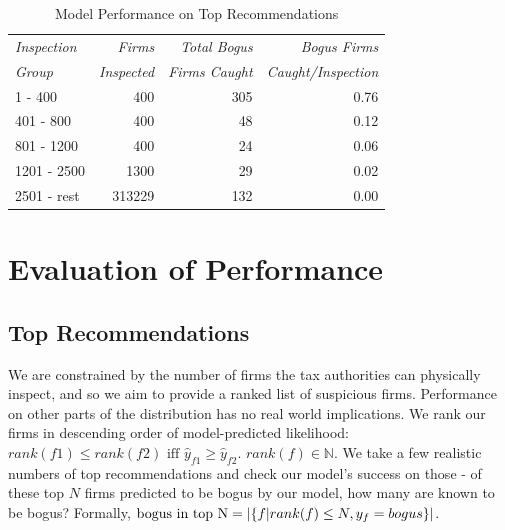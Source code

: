 \begin{table}[t!]
  \begin{tabular}{lrrr}
  	\toprule
	  {\small\textit{Inspection}}  & {\small\textit{Firms}}  &  {\small\textit{Total Bogus}}  &  {\small\textit{Bogus Firms}} \\
    {\small\textit{Group}} & {\small\textit{Inspected}} &{\small\textit{Firms Caught}} & {\small\textit{Caught/Inspection}}\\
    \midrule
              1 - 400 &              400 &                     305 &                           0.76 \\
            401 - 800 &              400 &                      48 &                           0.12 \\
            801 - 1200 &              400 &                      24 &                           0.06 \\
          1201 - 2500 &             1300 &                      29 &                           0.02 \\
          2501 - rest &           313229 &                     132 &                           0.00 \\
    \bottomrule
  \end{tabular}
  \caption{Model Performance on Top Recommendations}
  \label{tab:AllTimeCVPerformance}
\end{table}

\section{Evaluation of Performance}
\label{sec:evaluation}
\subsection{Top Recommendations}
\label{subsec:top-recommendations}
We are constrained by the number of firms the tax authorities can physically inspect, and so we aim to provide a ranked list of suspicious firms. Performance on other parts of the distribution has no real world implications. We rank our firms in descending order of model-predicted likelihood: $rank(f1) \leq rank(f2) \text{ iff } \hat{y}_{f1}\geq \hat{y}_{f2}\text{.  } rank(f) \in \mathbb{N}$. We take a few realistic numbers of top recommendations and check our model's success on those - of these top $N$ firms predicted to be bogus by our model, how many are known to be bogus? Formally, $\text{bogus in top N}=|\{f\space|\space rank(f)\le N,y_f=bogus\}|$. 

